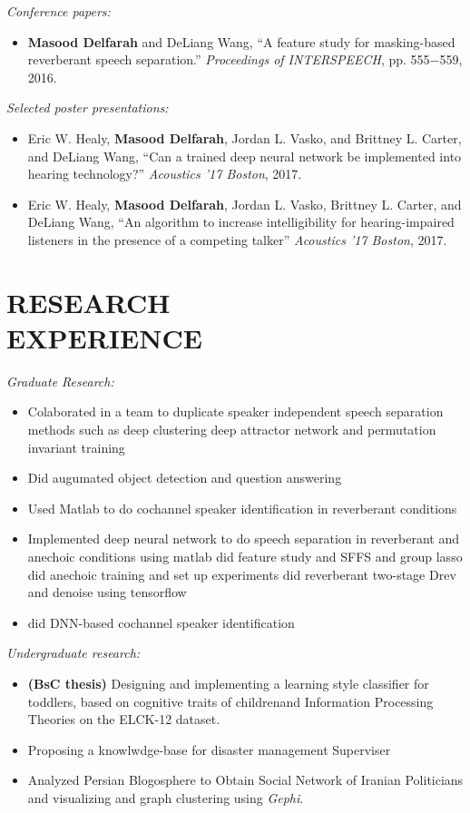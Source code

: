 \documentclass[margin, 10pt]{res}
\begin{document}
\begin{resume}
\textit{Conference papers:}
\begin{itemize}
\item \textbf{Masood Delfarah} and DeLiang Wang, ``A feature study for masking-based reverberant speech separation.'' \textit{Proceedings of INTERSPEECH}, pp. 555$-$559, 2016.
\end{itemize}

\textit{Selected poster presentations:}
\begin{itemize}
\item Eric W. Healy, \textbf{Masood Delfarah}, Jordan L. Vasko, and Brittney L. Carter, and DeLiang Wang, ``Can a trained deep neural network be implemented into hearing technology?'' \textit{Acoustics '17 Boston}, 2017.
\item Eric W. Healy, \textbf{Masood Delfarah}, Jordan L. Vasko, Brittney L. Carter, and DeLiang Wang, ``An algorithm to increase intelligibility for hearing-impaired listeners in the presence of a competing talker'' \textit{Acoustics '17 Boston}, 2017.
\end{itemize}

\section{RESEARCH \\ EXPERIENCE}
\textit{Graduate Research:}
\begin{itemize}
\item Colaborated in a team to duplicate speaker independent speech separation methods such as deep clustering deep attractor network and permutation invariant training
\item Did augumated object detection and question answering
\item Used Matlab to do cochannel speaker identification in reverberant conditions
\item Implemented deep neural network to do speech separation in reverberant and anechoic conditions using matlab
	\subitem did feature study and SFFS and group lasso
	\subitem did anechoic training and set up experiments
	\subitem did reverberant two-stage Drev and denoise using tensorflow
\item did DNN-based cochannel speaker identification 
\end{itemize}

\textit{Undergraduate research:}
\begin{itemize}
\item \textbf{(BsC thesis)} Designing and implementing a learning style classifier for toddlers, based on cognitive traits of childrenand Information Processing Theories on the ELCK-12 dataset.
\item Proposing a knowlwdge-base for disaster management Superviser
\item Analyzed Persian Blogosphere to Obtain Social Network of Iranian Politicians and visualizing and graph clustering using \textit{Gephi}.
\end{itemize}


\end{resume}
\end{document}
